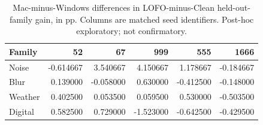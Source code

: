 \begin{table}[!htbp]
\centering\small
\setlength{\tabcolsep}{4pt}
\caption{Mac-minus-Windows differences in LOFO-minus-Clean held-out-family gain, in pp. Columns are matched seed identifiers. Post-hoc exploratory; not confirmatory.}\label{tab:tostseeds}
\begin{tabular}{lrrrrr}\toprule
Family & 52 & 67 & 999 & 555 & 1666\\\midrule
Noise & -0.614667 & 3.540667 & 4.150667 & 1.178667 & -0.184667\\
Blur & 0.139000 & -0.058000 & 0.630000 & -0.412500 & -0.148000\\
Weather & 0.402500 & 0.053500 & 0.059500 & 0.530000 & -0.503500\\
Digital & 0.582500 & 0.729000 & -1.523000 & -0.642500 & -0.429500\\
\bottomrule\end{tabular}
\end{table}
